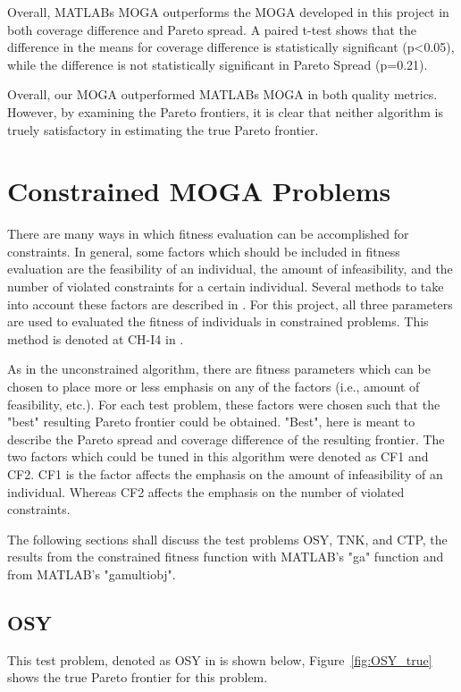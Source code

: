 \documentclass{article}
\begin{document}
\noindent Overall, MATLABs MOGA outperforms the MOGA developed in this project in both coverage difference and Pareto spread. A paired t-test shows that the difference in the means for coverage difference is statistically significant (p<0.05), while the difference is not statistically significant in Pareto Spread (p=0.21). \newline


\noindent Overall, our MOGA outperformed MATLABs MOGA in both quality metrics. However, by examining the Pareto frontiers, it is clear that neither algorithm is truely satisfactory in estimating the true Pareto frontier. 

\section{Constrained MOGA Problems}

There are many ways in which fitness evaluation can be accomplished for constraints. In general, some factors which should be included in fitness evaluation are the feasibility of an individual, the amount of infeasibility, and the number of violated constraints for a certain individual. Several methods to take into account these factors are described in \cite{kurpati2002constraint}. For this project, all three parameters are used to evaluated the fitness of individuals in constrained problems. This method is denoted at CH-I4 in \cite{kurpati2002constraint}. \newline

\noindent As in the unconstrained algorithm, there are fitness parameters which can be chosen to place more or less emphasis on any of the factors (i.e., amount of feasibility, etc.). For each test problem, these factors were chosen such that the "best" resulting Pareto frontier could be obtained. "Best", here is meant to describe the Pareto spread and coverage difference of the resulting frontier. The two factors which could be tuned in this algorithm were denoted as CF1 and CF2. CF1 is the factor affects the emphasis on the amount of infeasibility of an individual. Whereas CF2 affects the emphasis on the number of violated constraints. \newline

\noindent The following sections shall discuss the test problems OSY, TNK, and CTP, the results from the constrained fitness function with MATLAB's "ga" function and from MATLAB's "gamultiobj". 


\subsection{OSY} 
This test problem, denoted as OSY in \cite{deb2001multi} is shown below, Figure~\ref{fig:OSY_true} shows the true Pareto frontier for this problem.
\end{document}
